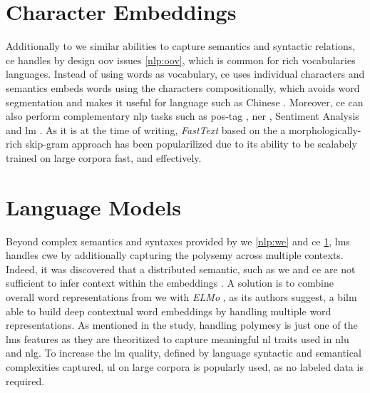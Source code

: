 \section{Character Embeddings}
\label{nlp:ce}
Additionally to \gls{we} similar abilities to capture semantics and syntactic relations, \gls{ce} handles by design \gls{oov} issues \ref{nlp:oov}, which is common for rich vocabularies languages. Instead of using words as vocabulary, \gls{ce} uses individual characters and semantics embeds words using the characters compositionally, which avoids word segmentation and makes it useful for language such as Chinese \autocite{paper:conf/ijcai/ChenXLSL15}. Moreover, \gls{ce} can also perform complementary \gls{nlp} tasks such as \gls{pos-tag} \autocite{paper:conf/icml/SantosZ14}, \gls{ner} \autocite{paper:ma-etal-2016-label}, Sentiment Analysis \autocite{paper:2017HaoYetal} and \gls{lm} \autocite{paper:journals/corr/KimJSR15}. As it is at the time of writing, \textit{FastText} based on the a morphologically-rich skip-gram approach \autocite{paper:journals/corr/BojanowskiGJM16} has been popularilized due to its ability to be scalabely trained on large corpora fast, and effectively. 

\section{Language Models}
\label{nlp-lm}
Beyond complex semantics and syntaxes provided by \gls{we} \ref{nlp:we} and \gls{ce} \ref{nlp:ce}, \glspl{lm} handles \gls{cwe} by additionally capturing the polysemy across multiple contexts. Indeed, it was discovered that a distributed semantic, such as \gls{we} and \gls{ce} are not sufficient to infer context within the embeddings \autocite{paper:journals/corr/LucyG17}. A solution is to combine overall word representations from \gls{we} with \textit{ELMo} \autocite{paper:journals/corr/abs-1802-05365}, as its authors suggest, a \gls{bilm} able to build deep contextual word embeddings by handling multiple word representations. As mentioned in the study, handling polymesy is just one of the \glspl{lm} features as they are theoritized to capture meaningful \gls{nl} traits used in \gls{nlu} and \gls{nlg}. To increase the \gls{lm} quality, defined by language syntactic and semantical complexities captured, \gls{ul} on large corpora is popularly used, as no labeled data is required.


